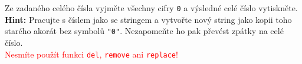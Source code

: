 \question[70]
Ze zadaného celého čísla vyjměte všechny cifry \texttt{0} a výsledné celé číslo
vytiskněte.\\
\textbf{Hint:} Pracujte s číslem jako se stringem a vytvořte nový string jako
kopii toho starého akorát bez symbolů \texttt{"0"}. Nezapomeňte ho pak převést
zpátky na celé číslo.\\
\textcolor{red}{Nesmíte použít funkci \texttt{del}, \texttt{remove} ani
	\texttt{replace}!}
